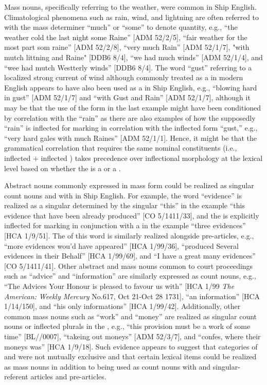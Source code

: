 Mass nouns, specifically referring to the weather, were common in Ship English. Climatological phenomena such as rain, wind, and lightning are often referred to with the mass determiner “much” or “some” to denote quantity, e.g., “the weather cold the last night some Raine” [ADM 52/2/5], “fair weather for the most part som raine” [ADM 52/2/8], “very much Rain” [ADM 52/1/7], "with mutch littning and Raine" [DDB6 8/4], “we had much winds” [ADM 52/1/4], and “wee had mutch Westterly winds” [DDB6 8/4]. The word “gust” referring to a localized strong current of wind although commonly treated as a  in modern English appears to have also been used as a  in Ship English, e.g., “blowing hard in gust” [ADM 52/1/7] and “with Gust and Rain” [ADM 52/1/7], although it may be that the use of the  form in the last example might have been conditioned by correlation with the  “rain” as there are also examples of how the supposedly  “rain” is inflected for  marking in correlation with the inflected form “gust,” e.g., “very hard gales with much Raines” [ADM 52/1/1]. Hence, it might be that the grammatical correlation that requires the same nominal constituents (i.e., inflected  + inflected ) takes precedence over inflectional morphology at the lexical level based on whether the  is a  or a . 

Abstract nouns commonly expressed in mass form could be realized as singular count nouns and with  in Ship English. For example, the word “evidence” is realized as a singular  determined by the singular  “this” in the example “this evidence that have been already produced” [CO 5/1411/33], and the  is explicitly inflected for  marking in conjunction with a  in the example “three evidences” [HCA 1/9/51]. The  of this word is similarly realized alongside  pre-articles, e.g., “more evidences wou’d have appeared” [HCA 1/99/36], “produced Several evidences in their Behalf” [HCA 1/99/69], and “I have a great many evidences” [CO 5/1411/41]. Other abstract and mass nouns common to court proceedings such as “advice” and “information” are similarly expressed as count nouns, e.g., “The Advices Your Honour is pleased to favour us with” [HCA 1/99 \textit{The American: Weekly Mercury} No.617, Oct 21-Oct 28 1731], “an information” [HCA 1/14/150], and “his only informations” [HCA 1/99/42]. Additionally, other common mass nouns such as “work” and “money” are realized as singular count nouns or inflected plurals in the , e.g., “this provision must be a work of some time” [BL/\citealt{Egerton2395}/0007], “takeing out moneys” [ADM 52/3/7], and “confes, where their moneys was” [HCA 1/9/18]. Such evidence appears to suggest that categories of  and  were not mutually exclusive and that certain lexical items could be realized as  mass nouns in addition to being used as count nouns with  and singular-referent articles and pre-articles. 

